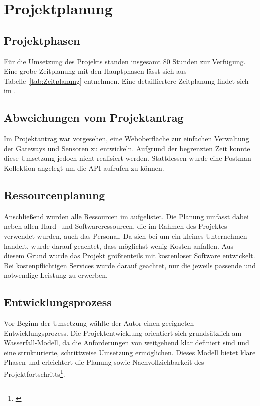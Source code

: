 \section{Projektplanung} 
\label{sec:Projektplanung}


\subsection{Projektphasen}
\label{sec:Projektphasen}
	Für die Umsetzung des Projekts standen insgesamt 80 Stunden zur Verfügung.
	Eine grobe Zeitplanung mit den Hauptphasen lässt sich aus Tabelle~\ref{tab:Zeitplanung} entnehmen.
	Eine detailliertere Zeitplanung findet sich im .
	


\subsection{Abweichungen vom Projektantrag}
\label{sec:AbweichungenProjektantrag}

	Im Projektantrag war vorgesehen, eine Weboberfläche zur einfachen Verwaltung der Gateways und Sensoren zu entwickeln.
	Aufgrund der begrenzten Zeit konnte diese Umsetzung jedoch nicht realisiert werden.
	Stattdessen wurde eine Postman Kollektion angelegt um die \ac{API} aufrufen zu können.


\subsection{Ressourcenplanung}
\label{sec:Ressourcenplanung}
	Anschließend wurden alle Ressourcen im  aufgelistet. Die Planung umfasst dabei neben allen Hard- und Softwareressourcen,
	die im Rahmen des Projektes verwendet wurden, auch das Personal. Da sich bei \OFF um ein kleines Unternehmen handelt, wurde darauf geachtet,
	dass möglichst wenig Kosten anfallen. Aus diesem Grund wurde das Projekt größtenteils mit kostenloser Software entwickelt.
	Bei kostenpflichtigen Services wurde darauf geachtet, nur die jeweils passende und notwendige Leistung zu erwerben.

\subsection{Entwicklungsprozess}
\label{sec:Entwicklungsprozess}
	Vor Beginn der Umsetzung wählte der Autor einen geeigneten Entwicklungsprozess.
	Die Projektentwicklung orientiert sich grundsätzlich am Wasserfall-Modell,
	da die Anforderungen von \OFF weitgehend klar definiert sind und eine strukturierte, schrittweise Umsetzung ermöglichen.
	Dieses Modell bietet klare Phasen und erleichtert die Planung sowie Nachvollziehbarkeit des Projektfortschritts\footnote{\Vgl \citet{Wasserfallmodell}}.
